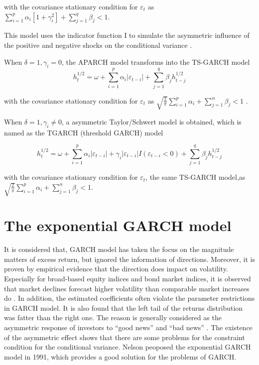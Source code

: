 with the  covariance stationary condition for $\varepsilon_{t}$ as $\sum_{i=1}^{p}\alpha_{i}[1+\gamma_{i}^{2}]+\sum_{j=1}^{q}\beta_{j}<1$.

This model uses the indicator function I to simulate the asymmetric influence of the positive and negative shocks on the conditional variance \citep{Glosten1993}.

When $\delta=1,\gamma_{i}=0$, the APARCH model transforms into the TS-GARCH model
\[h_{t}^{1/2} = \omega + \sum_{i=1}^{p}\alpha_{i}|\varepsilon_{t-i}|+\sum_{j=1}^{q}\beta_{j}h_{t-j}^{1/2}\]

with the covariance stationary condition for  $\varepsilon_{t}$ as  $\sqrt{\frac{2}{\pi}} \sum_{i=1}^{p}\alpha_{i} + \sum_{j=1}^{\alpha}\beta_{j}<1$
\citep{Schwert1990,stephen1986modelling}.

When $\delta=1,\gamma_{i}\neq0$, a asymmetric Taylor/Schwert model is obtained, which is named as the TGARCH (threshold GARCH) model

\[h_{t}^{1/2} = \omega + \sum_{i=1}^{p}\alpha_{i}|\varepsilon_{t-i}|+\gamma_i|\varepsilon_{t-i}|I(\varepsilon_{t-i}<0)+\sum_{j=1}^{q}\beta_{j}h_{t-j}^{1/2}\]

 with the covariance stationary condition for  $\varepsilon_{t}$, the same TS-GARCH model,as  $\sqrt{\frac{2}{\pi}} \sum_{i=1}^{p}\alpha_{i} + \sum_{j=1}^{\alpha}\beta_{j}<1$\citep{Zakoian1994}.


\section{The exponential GARCH model}

It is considered that, GARCH model has taken the focus on the magnitude matters of excess return, but ignored the information of directions. Moreover, it is proven by empirical evidence that the direction does impact on volatility. Especially for broad-based equity indices and bond market indices, it is observed that market declines forecast higher volatility than comparable market increases do \citep{Engle2001}. In addition, the estimated coefficients often violate the parameter restrictions in GARCH model. It is also found that the left tail of the returns distribution was fatter than the right one. The reason is generally considered as the asymmetric response of investors to “good news” and “bad news” \citep{Jondeau2003}. The existence of the asymmetric effect shows that there are some problems for the constraint condition for the  conditional variance. Nelson peoposed the exponential GARCH model in 1991, which provides a good solution for the problems of GARCH. 

